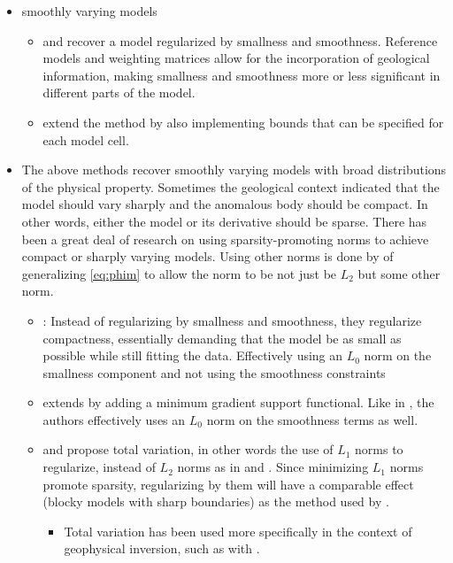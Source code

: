 \begin{itemize}
\item smoothly varying models
\begin{itemize}
\item \cite{li19963} and \cite{li19983} recover a model regularized by smallness and smoothness. Reference models and weighting matrices allow for the incorporation of geological information, making smallness and smoothness more or less significant in different parts of the model.
\item \cite{li2003fast}  extend the method by also implementing bounds that can be specified for each model cell.
\end{itemize}
\item The above methods recover smoothly varying models with broad distributions of the physical property. Sometimes the geological context indicated that the model should vary sharply and the anomalous body should be compact. In other words, either the model or its derivative should be sparse. There has been a great deal of research on using sparsity-promoting norms to achieve compact or sharply varying models. Using other norms is done by of generalizing \autoref{eq:phim} to allow the norm to be not just be $L_2$ but some other norm.
\begin{itemize}	
\item \cite{last1983compact}: Instead of regularizing by smallness and smoothness, they regularize compactness, essentially demanding that the model be as small as possible while still fitting the data. Effectively using an $L_0$ norm on the smallness component and not using the smoothness constraints	
\item \cite{portniaguine1999focusing} extends  \cite{last1983compact} by adding a minimum gradient support functional. Like in \cite{last1983compact}, the authors effectively uses an $L_0$ norm on the smoothness terms as well.
\item \cite{rudin1992nonlinear} and \cite{vogel1998fast} propose total variation, in other words the use of $L_1$ norms to regularize, instead of $L_2$ norms as in \cite{li19963} and \cite{li19983}. Since minimizing $L_1$ norms promote sparsity, regularizing by them will have a comparable effect (blocky models with sharp boundaries) as the method used by \cite{portniaguine1999focusing}.
	\begin{itemize}
		\item Total variation has been used more specifically in the context of geophysical inversion, such as with \cite{guitton2012blocky}.	

\end{itemize}
\end{itemize}
\end{itemize}
